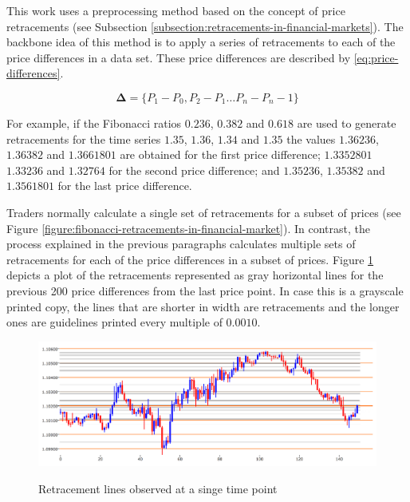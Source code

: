
This work uses a preprocessing method based on the concept of price retracements
(see Subsection \ref{subsection:retracements-in-financial-markets}). The
backbone idea of this method is to apply a series of retracements to each of the
price differences in a data set. These price differences are described by
\ref{eq:price-differences}.

\begin{equation}
  \label{eq:price-differences}
  \bm{\Delta} = \{ P_1 - P_0, P_2 - P_1 \ldots P_n - P_n-1 \}
\end{equation}

For example, if the Fibonacci ratios $0.236$, $0.382$ and $0.618$ are used to
generate retracements for the time series $1.35$, $1.36$, $1.34$ and $1.35$ the
values $1.36236$, $1.36382$ and $1.3661801$ are obtained for the first price
difference; $1.3352801$ $1.33236$ and $1.32764$ for the second price difference;
and $1.35236$, $1.35382$ and $1.3561801$ for the last price difference.

Traders normally calculate a single set of retracements for a subset of prices
(see Figure \ref{figure:fibonacci-retracements-in-financial-market}). In
contrast, the process explained in the previous paragraphs calculates multiple
sets of retracements for each of the price differences in a subset of
prices. Figure \ref{figure:retracements-one-price} depicts a plot of the
retracements represented as gray horizontal lines for the previous 200 price
differences from the last price point. In case this is a grayscale printed copy,
the lines that are shorter in width are retracements and the longer ones are
guidelines printed every multiple of $0.0010$.

\begin{figure}
\caption{Retracement lines observed at a singe time point} \centering
\includegraphics[width=1.0\textwidth]{img/retracements-preprocessing-one-price.png}
\label{figure:retracements-one-price}
\end{figure}

